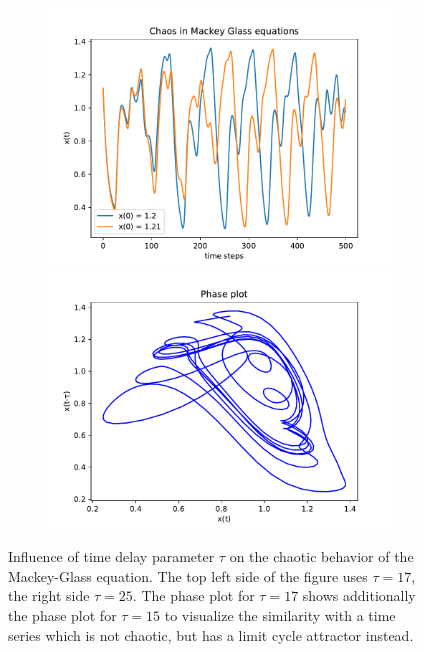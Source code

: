 \begin{figure}
\begin{subfigure}{.51\textwidth}
        \includegraphics[width=\textwidth]{figures/mg_chaos_25.pdf}
        \includegraphics[width=\textwidth]{figures/25.pdf}
    \end{subfigure}
    \caption{Influence of time delay parameter $\tau$ on the chaotic behavior of
        the Mackey-Glass equation. The top left side of the figure
        uses $\tau = 17$, the right side $\tau = 25$. The phase plot for 
        $\tau=17$ shows additionally the phase plot for $\tau=15$ to visualize 
        the similarity with a time series which is not chaotic, but has 
        a limit cycle attractor instead.}
    \label{fig:mackey_chaos}
\end{figure}

